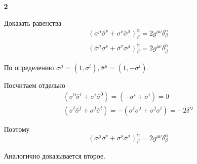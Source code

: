 \documentclass[a4paper,12pt]{article} %
\begin{document}
\begin{task}\textbf{2}

Доказать равенства
$$
\begin{array}{l}
\left(\sigma^{\mu} \bar{\sigma}^{\nu}+\sigma^{\nu} \bar{\sigma}^{\mu}\right)_{\beta}^{\alpha}=2 g^{\mu \nu} \delta_{\beta}^{\alpha} \\
\left(\bar{\sigma}^{\mu} \sigma^{\nu}+\bar{\sigma}^{\nu} \sigma^{\mu}\right)_{\dot{\beta}}^{\dot{\alpha}}=2 g^{\mu \nu} \delta_{\dot{\beta}}^{\dot{\alpha}}
\end{array}
$$

По определению $ \sigma^{\mu}=(1,\sigma^{i}), \bar{\sigma}^{\mu}= (1,-\sigma^i)$.

Посчитаем отдельно 
$$
\begin{array}{l}
	\left(\sigma^{0} \bar{\sigma}^{i}+\sigma^{i} \bar{\sigma}^{0}\right)=
	(-\sigma^{i}+\sigma^{i})=0
	\\
	\left(\sigma^{i} \bar{\sigma}^{j}+\sigma^{j} \bar{\sigma}^{i}\right)=
-(\sigma^{i}\sigma^{j}+\sigma^{j}\sigma^{i})=-2\delta^{ij}
\end{array}
$$

Поэтому 
\[ \left(\sigma^{\mu} \bar{\sigma}^{\nu}+\sigma^{\nu} \bar{\sigma}^{\mu}\right)_{\beta}^{\alpha}=
2 g^{\mu \nu} \delta_{\beta}^{\alpha} \]


Аналогично доказывается второе.






\end{task}
\end{document}
